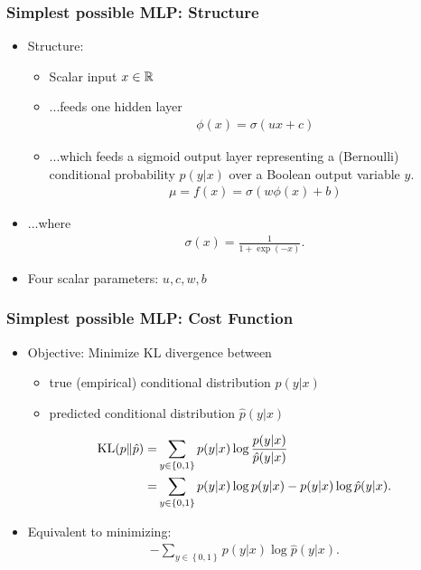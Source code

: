 \documentclass{beamer}
\begin{document}
\begin{frame}
\frametitle{Simplest possible MLP: Structure}

\begin{itemize}
\item Structure:
\begin{itemize}
\item Scalar input $x \in \mathbb{R}$
\item ...feeds one hidden layer
\begin{align*}
    \phi(x) = \sigma(u x + c)
\end{align*}
\item ...which feeds a sigmoid output layer representing a (Bernoulli) conditional probability $p(y|x)$ over a Boolean output variable $y$.
\begin{align*}
    \mu = f(x) = \sigma(w \phi(x) + b)
\end{align*}
\end{itemize}
\item ...where
\begin{align*}
    \sigma(x) = \frac{1}{1+\exp(-x)}.
\end{align*}
\item Four scalar parameters: $u, c, w, b$
\end{itemize}

\end{frame}


\begin{frame}
\frametitle{Simplest possible MLP: Cost Function}

\begin{itemize}
\item Objective: Minimize KL divergence between
\begin{itemize}
\item true (empirical) conditional distribution $p(y|x)$ 
\item predicted conditional distribution $\hat{p}(y|x)$
\end{itemize}
\begin{align*}
    \text{KL}(p\|\hat{p}) =& \sum_{y \in \left\{0, 1\right\}} p(y|x) \log
    \frac{p(y|x)}{\hat{p}(y|x)} \\
    =& \sum_{y \in \left\{0, 1\right\}} p(y|x) \log p(y|x) - p(y|x) \log
    {\hat{p}(y|x)}.
\end{align*}
\item Equivalent to minimizing:
\begin{align*}
 - \sum_{y \in \left\{0, 1\right\}} p(y|x) \log {\hat{p}(y|x)}.
\end{align*}
\end{itemize}

\end{frame}
\end{document}
